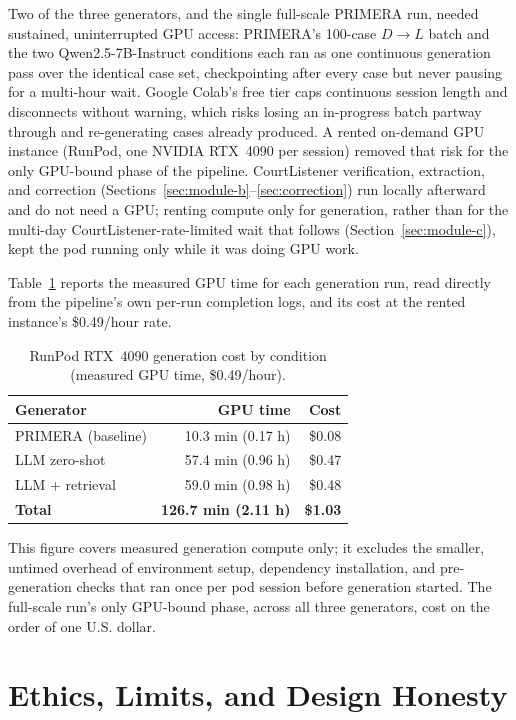 Two of the three generators, and the single full-scale PRIMERA run, needed sustained, uninterrupted GPU access: PRIMERA's 100-case $D\rightarrow L$ batch and the two Qwen2.5-7B-Instruct conditions each ran as one continuous generation pass over the identical case set, checkpointing after every case but never pausing for a multi-hour wait. Google Colab's free tier caps continuous session length and disconnects without warning, which risks losing an in-progress batch partway through and re-generating cases already produced. A rented on-demand GPU instance (RunPod, one NVIDIA RTX~4090 per session) removed that risk for the only GPU-bound phase of the pipeline. CourtListener verification, extraction, and correction (Sections~\ref{sec:module-b}--\ref{sec:correction}) run locally afterward and do not need a GPU; renting compute only for generation, rather than for the multi-day CourtListener-rate-limited wait that follows (Section~\ref{sec:module-c}), kept the pod running only while it was doing GPU work.

Table~\ref{tab:runpod-cost} reports the measured GPU time for each generation run, read directly from the pipeline's own per-run completion logs, and its cost at the rented instance's \$0.49/hour rate.

\begin{table}[!t]
\centering
\caption{RunPod RTX~4090 generation cost by condition (measured GPU time, \$0.49/hour).}
\label{tab:runpod-cost}
\begin{tabular}{@{}l r r@{}}
\toprule
\textbf{Generator} & \textbf{GPU time} & \textbf{Cost} \\
\midrule
PRIMERA (baseline) & 10.3 min (0.17 h) & \$0.08 \\
LLM zero-shot & 57.4 min (0.96 h) & \$0.47 \\
LLM + retrieval & 59.0 min (0.98 h) & \$0.48 \\
\midrule
\textbf{Total} & \textbf{126.7 min (2.11 h)} & \textbf{\$1.03} \\
\bottomrule
\end{tabular}
\end{table}

This figure covers measured generation compute only; it excludes the smaller, untimed overhead of environment setup, dependency installation, and pre-generation checks that ran once per pod session before generation started. The full-scale run's only GPU-bound phase, across all three generators, cost on the order of one U.S. dollar.

\section{Ethics, Limits, and Design Honesty}
\label{sec:method-ethics}

